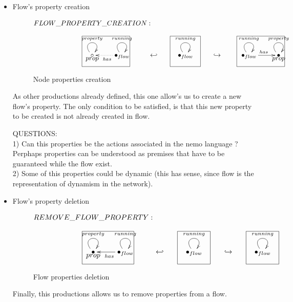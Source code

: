 \documentclass[envcountsect,runningheads]{llncs}
\begin{document}
\begin{itemize}
  \item Flow's property creation
  \begin{figure}[H]
    \[
       \xymatrix@C=25pt@R=16pt
       {
         {}\POS[]-<0pc,0pc>\drop{FLOW\_PROPERTY\_CREATION:}
         \\
         \\
         \circ \ar@(ul,ur)^{property} \POS[]-<0pc,.5pc>\drop{prop} &
         {\bullet}_{flow} \ar@(ul,ur)^{running} \ar@{.>}^{has}[l]
         \POS[]+<-2pc,.5pc> *+=<6pc,3.8pc>[F-]{} & {\hookleftarrow} &
         {\bullet}_{flow} \ar@(ul,ur)^{running}
         \POS[]+<0pc,.5pc> *+=<3.8pc,3.8pc>[F-]{} & {\hookrightarrow} &
         {\bullet}_{flow} \ar@(ul,ur)^{running} \ar@{->}^{has}[r]
         \POS[]+<1.5pc,.5pc> *+=<6pc,3.8pc>[F-]{} &
         {\bullet} \ar@(ul,ur)^{property} \POS[]-<0pc,.5pc>\drop{prop}
       }
    \]
    \caption{Node properties creation}
    \protect\label{fig:nodecreation}
  \end{figure}
  As other productions already defined, this one allow's us to create a new 
  flow's property. The only condition to be satisfied, is that this new property 
  to be created is not already created in flow.
  
  QUESTIONS:\\
  1) Can this properties be the actions associated in the nemo language ? 
  Perphaps properties can be understood as premises that have to be guaranteed 
  while the flow exist. \\
  2) Some of this properties could be dynamic (this has sense, since flow is the representation 
  of dynamism in the network). \\

  \item Flow's property deletion
  \begin{figure}[H]
    \[
       \xymatrix@C=25pt@R=16pt
       {
         {}\POS[]-<0pc,0pc>\drop{REMOVE\_FLOW\_PROPERTY:}
         \\
         \\
         {\bullet} \ar@(ul,ur)^{property} \POS[]-<0pc,.5pc>\drop{prop} &
         {\bullet}_{flow} \ar@(ul,ur)^{running} \ar@{->}^{has}[l]
         \POS[]+<-2pc,.5pc> *+=<6pc,3.8pc>[F-]{} & {\hookleftarrow} &
         {\bullet}_{flow} \ar@(ul,ur)^{running}
         \POS[]+<0pc,.5pc> *+=<3.8pc,3.8pc>[F-]{} & {\hookrightarrow} &
         {\bullet}_{flow} \ar@(ul,ur)^{running}
         \POS[]+<0pc,.5pc> *+=<3.8pc,3.8pc>[F-]{} 
       }
    \]
    \caption{Flow properties deletion}
    \protect\label{fig:flowpropertydeletion}
  \end{figure}
  Finally, this productions allows us to remove properties from a flow.
   
\end{itemize} 
\end{document}

